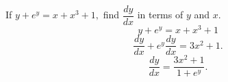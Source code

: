 If $y + e^y = x + x^3 + 1,$ find $\dfrac{dy}{dx}$ in terms of $y$ and $x$.
\newline
\[
y + e^y = x + x^3 + 1
\]
\[
\frac{dy}{dx} + e^y\frac{dy}{dx} = 3x^2 + 1.
\]
\[
\frac{dy}{dx} = \frac{3x^2+1}{1 + e^y}.
\]